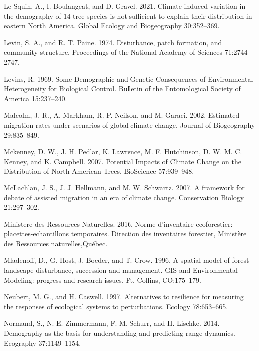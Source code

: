 \documentclass[12pt]{article}
\newlength{\cslhangindent}
\newenvironment{cslreferences}%
  {\setlength{\parindent}{0pt}%
  \everypar{\setlength{\hangindent}{\cslhangindent}}\ignorespaces}%
  {\par}
\begin{document}
\begin{cslreferences}
\leavevmode\hypertarget{ref-LeSquin2021}{}%
Le Squin, A., I. Boulangeat, and D. Gravel. 2021. Climate-induced
variation in the demography of 14 tree species is not sufficient to
explain their distribution in eastern North America. Global Ecology and
Biogeography 30:352--369.

\leavevmode\hypertarget{ref-Levin1974}{}%
Levin, S. A., and R. T. Paine. 1974. Disturbance, patch formation, and
community structure. Proceedings of the National Academy of Sciences
71:2744--2747.

\leavevmode\hypertarget{ref-Levins1969}{}%
Levins, R. 1969. Some Demographic and Genetic Consequences of
Environmental Heterogeneity for Biological Control. Bulletin of the
Entomological Society of America 15:237--240.

\leavevmode\hypertarget{ref-Malcolm2002}{}%
Malcolm, J. R., A. Markham, R. P. Neilson, and M. Garaci. 2002.
Estimated migration rates under scenarios of global climate change.
Journal of Biogeography 29:835--849.

\leavevmode\hypertarget{ref-Mckenney2007}{}%
Mckenney, D. W., J. H. Pedlar, K. Lawrence, M. F. Hutchinson, D. W. M.
C. Kenney, and K. Campbell. 2007. Potential Impacts of Climate Change on
the Distribution of North American Trees. BioScience 57:939--948.

\leavevmode\hypertarget{ref-McLachlan2007}{}%
McLachlan, J. S., J. J. Hellmann, and M. W. Schwartz. 2007. A framework
for debate of assisted migration in an era of climate change.
Conservation Biology 21:297--302.

\leavevmode\hypertarget{ref-Naturelles2016}{}%
Ministere des Ressources Naturelles. 2016. Norme d'inventaire
ecoforestier: placettes-echantillons temporaires. Direction des
inventaires forestier, Ministère des Ressources naturelles,Québec.

\leavevmode\hypertarget{ref-Mladenoff1996}{}%
Mladenoff, D., G. Host, J. Boeder, and T. Crow. 1996. A spatial model of
forest landscape disturbance, succession and management. GIS and
Environmental Modeling: progress and research issues. Ft. Collins,
CO:175--179.

\leavevmode\hypertarget{ref-Neubert1997}{}%
Neubert, M. G., and H. Caswell. 1997. Alternatives to resilience for
measuring the responses of ecological systems to perturbations. Ecology
78:653--665.

\leavevmode\hypertarget{ref-Normand2014}{}%
Normand, S., N. E. Zimmermann, F. M. Schurr, and H. Lischke. 2014.
Demography as the basis for understanding and predicting range dynamics.
Ecography 37:1149--1154.


\end{cslreferences}
\end{document}
